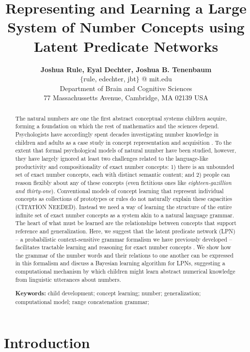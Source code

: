\documentclass[10pt,letterpaper]{article}
\title{Representing and Learning a Large System of Number Concepts using Latent Predicate Networks}
\author{{\large \bf Joshua Rule, Eyal Dechter, Joshua B. Tenenbaum} \\
  $\{$rule, edechter, jbt$\}$ @ mit.edu \\
  Department of Brain and Cognitive Sciences\\
  77 Massachussetts Avenue, Cambridge, MA 02139 USA}
\begin{document}
\maketitle

\begin{abstract}
  The natural numbers are one the first abstract conceptual systems
  children acquire, forming a foundation on which the rest of
  mathematics and the sciences depend. Psychologists have accordingly
  spent decades investigating number knowledge in children and adults
  as a case study in concept representation and acquisition
  \citep[{\it e.g.}][]{Car2009}. To the extent that formal
  psychological models of natural number have been studied, however,
  they have largely ignored at least two challenges related to the
  language-like productivity and compositionality of exact number
  concepts: 1) there is an unbounded set of exact number concepts,
  each with distinct semantic content; and 2) people can reason
  flexibly about any of these concepts (even fictitious ones like
  \emph{eighteen-gazillion and thirty-one}). Conventional models of
  concept learning that represent individual concepts as collections
  of prototypes or rules do not naturally explain these capacities
  (CITATION NEEDED). Instead we need a way of learning the structure
  of the entire infinite set of exact number concepts as a system akin
  to a natural language grammar. The heart of what must be learned are
  the relationships between concepts that support reference and
  generalization. Here, we suggest that the latent predicate network
  (LPN) -- a probabilistic context-sensitive grammar formalism we have
  previously developed -- facilitates tractable learning and reasoning
  for exact number concepts \citep{DecRulTenming}. We show how the
  grammar of the number words and their relations to one another can
  be expressed in this formalism and discuss a Bayesian learning
  algorithm for LPNs, suggesting a computational mechanism by which
  children might learn abstract numerical knowledge from linguistic
  utterances about numbers.

  \textbf{Keywords:}
  child development; concept learning; number; generalization;
  computational model; range concatenation grammar;
\end{abstract}

\section{Introduction}
\end{document}

